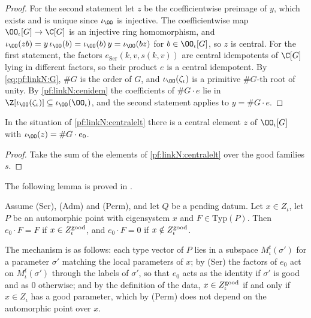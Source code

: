 \begin{proof}
For the second statement let $z$ be the coefficientwise preimage of $y$, which exists and is unique since $\iota_\OO$ is injective.
The coefficientwise map $\OO_\iota[G]\to\C[G]$ is an injective ring homomorphism, and $\iota_\OO(zb)=y\,\iota_\OO(b)=\iota_\OO(b)\,y=\iota_\OO(bz)$
for $b\in\OO_\iota[G]$, so $z$ is central. For the first statement, the factors $e_{\mathrm{Ser}}(k,v,s(k,v))$ are central
idempotents of $\C[G]$ lying in different factors, so their product $e$ is a central idempotent. By \eqref{eq:pf:linkN:G}, $\#G$ is
the order of $G$, and $\iota_\OO(\zeta_\iota)$ is a primitive $\#G$-th root of unity. By \cref{pf:linkN:cenidem} the coefficients of
$\#G\cdot e$ lie in $\Z[\iota_\OO(\zeta_\iota)]\subseteq\iota_\OO(\OO_\iota)$, and the second statement applies to $y=\#G\cdot e$.
\end{proof}

\begin{corollary}\label{pf:linkN:goodelt}
In the situation of \cref{pf:linkN:centralelt} there is a central element $z$ of $\OO_\iota[G]$ with $\iota_\OO(z)=\#G\cdot e_0$.
\end{corollary}

\begin{proof}
Take the sum of the elements of \cref{pf:linkN:centralelt} over the good families $s$.
\end{proof}

The following lemma is proved in .

\begin{lemma}\label{pf:linkN:typevec}
Assume (Ser), (Adm) and (Perm), and let $Q$ be a pending datum. Let $x\in Z_\iota$, let $P$ be an automorphic point with
eigensystem $x$ and $F\in\mathrm{Typ}(P)$. Then $e_0\cdot F=F$ if $x\in Z^{\mathrm{good}}_\iota$, and $e_0\cdot F=0$ if $x\notin Z^{\mathrm{good}}_\iota$.
\end{lemma}

The mechanism is as follows: each type vector of $P$ lies in a subspace $M^t_\iota(\sigma')$ for a parameter $\sigma'$ matching
the local parameters of $x$; by (Ser) the factors of $e_0$ act on $M^t_\iota(\sigma')$ through the labels of $\sigma'$, so that $e_0$
acts as the identity if $\sigma'$ is good and as $0$ otherwise; and by the definition of the data, $x\in Z^{\mathrm{good}}_\iota$ if and
only if $x\in Z_\iota$ has a good parameter, which by (Perm) does not depend on the automorphic point over $x$.

